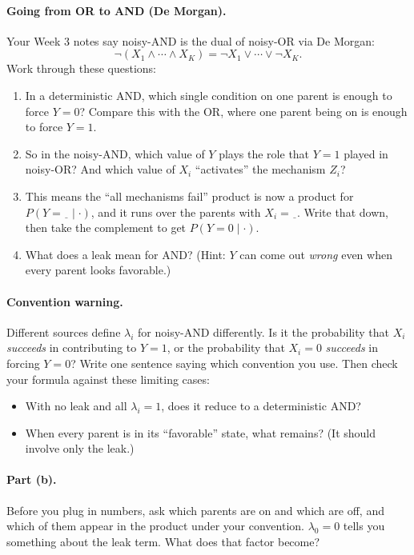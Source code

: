 \documentclass[11pt]{article}
\begin{document}
\paragraph{Going from OR to AND (De Morgan).}
Your Week 3 notes say noisy-AND is the dual of noisy-OR via De Morgan:
\[
  \lnot(X_1 \land \cdots \land X_K) = \lnot X_1 \lor \cdots \lor \lnot X_K .
\]
Work through these questions:
\begin{enumerate}
  \item In a deterministic AND, which single condition on one parent is
        enough to force $Y = 0$? Compare this with the OR, where one parent
        being on is enough to force $Y = 1$.
  \item So in the noisy-AND, which value of $Y$ plays the role that $Y=1$
        played in noisy-OR? And which value of $X_i$ ``activates'' the
        mechanism $Z_i$?
  \item This means the ``all mechanisms fail'' product is now a product for
        $P(Y = \underline{\ \ } \mid \cdot)$, and it runs over the parents
        with $X_i = \underline{\ \ }$. Write that down, then take the
        complement to get $P(Y=0 \mid \cdot)$.
  \item What does a leak mean for AND? (Hint: $Y$ can come out \emph{wrong}
        even when every parent looks favorable.)
\end{enumerate}

\paragraph{Convention warning.}
Different sources define $\lambda_i$ for noisy-AND differently. Is it the
probability that $X_i$ \emph{succeeds} in contributing to $Y=1$, or the
probability that $X_i=0$ \emph{succeeds} in forcing $Y=0$? Write one
sentence saying which convention you use. Then check your formula against
these limiting cases:
\begin{itemize}
  \item With no leak and all $\lambda_i = 1$, does it reduce to a
        deterministic AND?
  \item When every parent is in its ``favorable'' state, what remains?
        (It should involve only the leak.)
\end{itemize}

\paragraph{Part (b).} Before you plug in numbers, ask which parents are on
and which are off, and which of them appear in the product under your
convention. $\lambda_0 = 0$ tells you something about the leak term. What
does that factor become?
\end{document}
